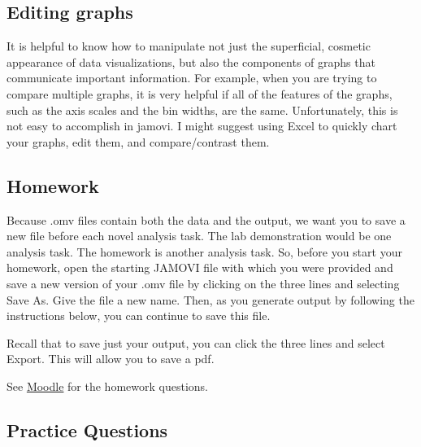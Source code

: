 \documentclass[
]{book}
\begin{document}
\hypertarget{editing-graphs-1}{%
\subsection{Editing graphs}\label{editing-graphs-1}}

It is helpful to know how to manipulate not just the superficial, cosmetic appearance of data visualizations, but also the components of graphs that communicate important information. For example, when you are trying to compare multiple graphs, it is very helpful if all of the features of the graphs, such as the axis scales and the bin widths, are the same. Unfortunately, this is not easy to accomplish in jamovi. I might suggest using Excel to quickly chart your graphs, edit them, and compare/contrast them.

\hypertarget{homework-4}{%
\subsection{Homework}\label{homework-4}}

Because .omv files contain both the data and the output, we want you to save a new file before each novel analysis task. The lab demonstration would be one analysis task. The homework is another analysis task. So, before you start your homework, open the starting JAMOVI file with which you were provided and save a new version of your .omv file by clicking on the three lines and selecting {Save As}. Give the file a new name. Then, as you generate output by following the instructions below, you can continue to save this file.

Recall that to save just your output, you can click the three lines and select {Export}. This will allow you to save a pdf.

See \href{https://moodle.stfx.ca/course/view.php?id=29319}{Moodle} for the homework questions.

\hypertarget{practice-questions}{%
\subsection{Practice Questions}\label{practice-questions}}
\end{document}
